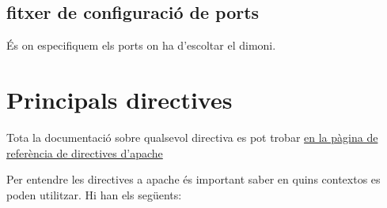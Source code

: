 \documentclass[a4paper, 11pt]{article}
\begin{document}

\subsection{fitxer de configuració de ports}
És on especifiquem els ports on ha d'escoltar el dimoni.
\section{Principals directives}

Tota la documentació sobre qualsevol directiva es pot trobar \href{https://httpd.apache.org/docs/2.4/mod/directives.html}{en la pàgina de referència de directives d'apache}

Per entendre les directives a apache \'es important saber en quins contextos es poden utilitzar. Hi han els següents:
\end{document}
